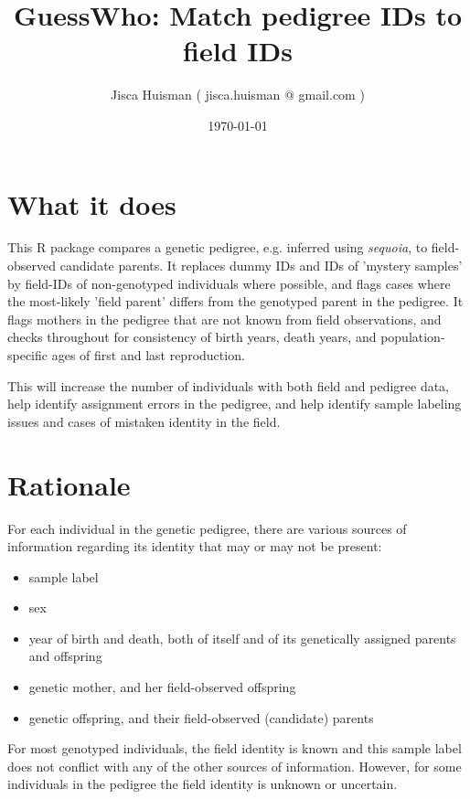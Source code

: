\documentclass[a4paper, 12pt]{article}
\begin{document}

\title{GuessWho: Match pedigree IDs to field IDs}
\author{\vspace{-1em} Jisca Huisman ( jisca.huisman @ gmail.com )}
\date{\small\today}

\maketitle

\section{What it does}
This R package compares a genetic pedigree, e.g. inferred using \emph{sequoia}, to field-observed candidate parents. It replaces dummy IDs and IDs of 'mystery samples' by field-IDs of non-genotyped individuals where possible, and flags cases where the most-likely 'field parent' differs from the genotyped parent in the pedigree. It flags mothers in the pedigree that are not known from field observations, and checks throughout for consistency of birth years, death years, and population-specific ages of first and last reproduction.

This will increase the number of individuals with both field and pedigree data, help identify assignment errors in the pedigree, and help identify sample labeling issues and cases of mistaken identity in the field.


\section{Rationale}
For each individual in the genetic pedigree, there are various sources of information regarding its identity that may or may not be present:
\begin{itemize}
	\item sample label
	\item sex
	\item year of birth and death, both of itself and of its genetically assigned parents and offspring
	\item genetic mother, and her field-observed offspring
	\item genetic offspring, and their field-observed (candidate) parents
\end{itemize}

For most genotyped individuals, the field identity is known and this sample label does not conflict with any of the other sources of information. However, for some individuals in the pedigree the field identity is unknown or uncertain.
\end{document}
